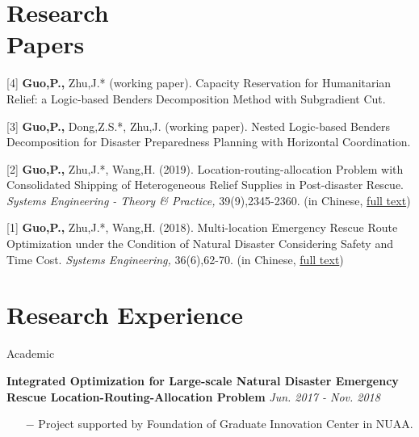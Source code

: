 \documentclass[margin]{res}
\begin{document}
\begin{resume}
\vspace{-.8em}
\section{\sc Research \\Papers}


[4] \textbf{Guo,P.,} Zhu,J.* (working paper). Capacity Reservation for Humanitarian Relief: a Logic-based Benders Decomposition Method with Subgradient Cut.
\vspace{-.8em}

[3] \textbf{Guo,P.,} Dong,Z.S.*, Zhu,J. (working paper). Nested Logic-based Benders Decomposition for Disaster Preparedness Planning with Horizontal Coordination.
\vspace{-.8em}

[2] \textbf{Guo,P.,} Zhu,J.*, Wang,H. (2019). Location-routing-allocation Problem with Consolidated Shipping of Heterogeneous Relief Supplies in Post-disaster Rescue. \textit{Systems Engineering - Theory \& Practice,} 39(9),2345-2360. (in Chinese, \href{https://docs.google.com/viewer?url=https://github.com/phguo/phguo.github.io/raw/master/full_text/zh-LocationRoutingAllocation.pdf}{full text})
\vspace{-.8em}

[1] \textbf{Guo,P.,} Zhu,J.*, Wang,H. (2018). Multi-location Emergency Rescue Route Optimization under the Condition of Natural Disaster Considering Safety and Time Cost. \textit{Systems Engineering,} 36(6),62-70. (in Chinese, \href{https://docs.google.com/viewer?url=https://github.com/phguo/phguo.github.io/raw/master/full_text/zh-RiskTime.pdf}{full text})

\vspace{-.8em}
\section{\sc Research Experience}


{\sc Academic}
\vspace{-.8em}

\textbf{{Integrated Optimization for Large-scale Natural Disaster Emergency Rescue Location-Routing-Allocation Problem}} \hspace{65pt} {\it Jun. 2017 - Nov. 2018}
\begin{itemize} \itemsep -2pt  %
\item[\(-\)] Project supported by {Foundation of Graduate Innovation Center in NUAA}.
\end{itemize}



\end{resume}
\end{document}
